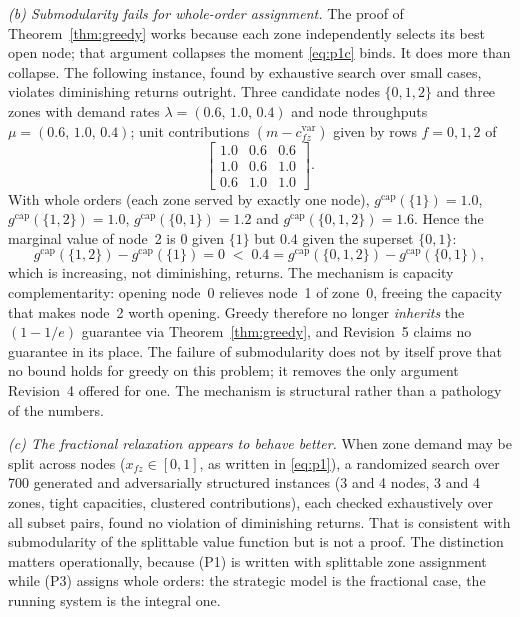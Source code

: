 \emph{(b) Submodularity fails for whole-order assignment.} The proof of Theorem~\ref{thm:greedy} works because each zone independently selects its best open node; that argument collapses the moment \eqref{eq:p1c} binds. It does more than collapse. The following instance, found by exhaustive search over small cases, violates diminishing returns outright. Three candidate nodes $\{0,1,2\}$ and three zones with demand rates $\lambda=(0.6,\,1.0,\,0.4)$ and node throughputs $\mu=(0.6,\,1.0,\,0.4)$; unit contributions $(m-c^{\mathrm{var}}_{fz})$ given by rows $f=0,1,2$ of
\[
\begin{bmatrix}1.0&0.6&0.6\\ 1.0&0.6&1.0\\ 0.6&1.0&1.0\end{bmatrix}.
\]
With whole orders (each zone served by exactly one node), $g^{\mathrm{cap}}(\{1\})=1.0$, $g^{\mathrm{cap}}(\{1,2\})=1.0$, $g^{\mathrm{cap}}(\{0,1\})=1.2$ and $g^{\mathrm{cap}}(\{0,1,2\})=1.6$. Hence the marginal value of node~2 is $0$ given $\{1\}$ but $0.4$ given the superset $\{0,1\}$:
\[
g^{\mathrm{cap}}(\{1,2\})-g^{\mathrm{cap}}(\{1\})=0 \;<\; 0.4 = g^{\mathrm{cap}}(\{0,1,2\})-g^{\mathrm{cap}}(\{0,1\}),
\]
which is increasing, not diminishing, returns. The mechanism is capacity complementarity: opening node~0 relieves node~1 of zone~0, freeing the capacity that makes node~2 worth opening. Greedy therefore no longer \emph{inherits} the $(1-1/e)$ guarantee via Theorem~\ref{thm:greedy}, and Revision~5 claims no guarantee in its place. The failure of submodularity does not by itself prove that no bound holds for greedy on this problem; it removes the only argument Revision~4 offered for one. The mechanism is structural rather than a pathology of the numbers.

\emph{(c) The fractional relaxation appears to behave better.} When zone demand may be split across nodes ($x_{fz}\in[0,1]$, as written in \eqref{eq:p1}), a randomized search over 700 generated and adversarially structured instances (3 and 4 nodes, 3 and 4 zones, tight capacities, clustered contributions), each checked exhaustively over all subset pairs, found no violation of diminishing returns. That is consistent with submodularity of the splittable value function but is not a proof. The distinction matters operationally, because (P1) is written with splittable zone assignment while (P3) assigns whole orders: the strategic model is the fractional case, the running system is the integral one. 

